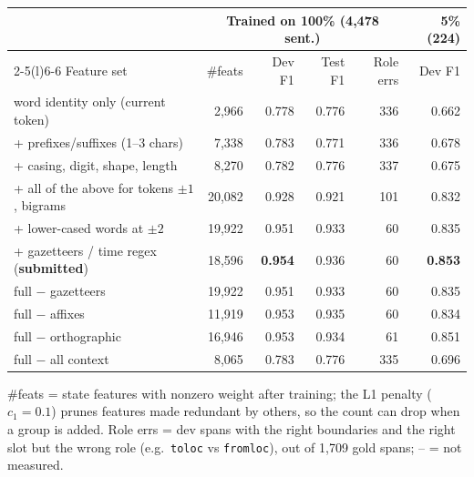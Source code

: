 \begin{tabular}{@{}lrrrrr@{}}
\toprule
 & \multicolumn{4}{c}{Trained on 100\% (4,478 sent.)} & 5\% (224) \\
\cmidrule(lr){2-5}\cmidrule(l){6-6}
Feature set & \#feats & Dev F1 & Test F1 & Role errs & Dev F1 \\
\midrule
word identity only (current token) & 2,966 & 0.778 & 0.776 & 336 & 0.662 \\
\quad + prefixes/suffixes (1--3 chars) & 7,338 & 0.783 & 0.771 & 336 & 0.678 \\
\quad + casing, digit, shape, length & 8,270 & 0.782 & 0.776 & 337 & 0.675 \\
\quad + all of the above for tokens $\pm1$, bigrams & 20,082 & 0.928 & 0.921 & 101 & 0.832 \\
\quad + lower-cased words at $\pm2$ & 19,922 & 0.951 & 0.933 & 60 & 0.835 \\
\quad + gazetteers / time regex (\textbf{submitted}) & 18,596 & \textbf{0.954} & 0.936 & 60 & \textbf{0.853} \\
\midrule
full $-$ gazetteers & 19,922 & 0.951 & 0.933 & 60 & 0.835 \\
full $-$ affixes & 11,919 & 0.953 & 0.935 & 60 & 0.834 \\
full $-$ orthographic & 16,946 & 0.953 & 0.934 & 61 & 0.851 \\
full $-$ all context & 8,065 & 0.783 & 0.776 & 335 & 0.696 \\
\bottomrule
\end{tabular}
\par\vspace{3pt}\parbox{0.86\linewidth}{\scriptsize \#feats = state features with nonzero weight after training; the L1 penalty ($c_1{=}0.1$) prunes features made redundant by others, so the count can drop when a group is added. Role errs = dev spans with the right boundaries and the right slot but the wrong role (e.g.\ \texttt{toloc} vs \texttt{fromloc}), out of 1,709 gold spans; -- = not measured.}
